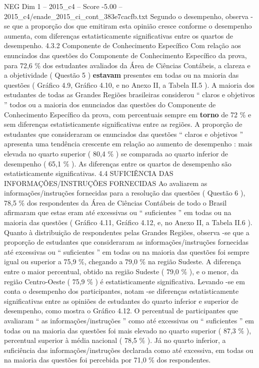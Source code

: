 \begin{textsample}{NEG Dim 1 – 2015\_c4 – Score -5.00 – 2015\_c4/enade\_2015\_ci\_cont\_383e7cacfb.txt}
Segundo o desempenho, observa -se que a proporção dos que emitiram esta opinião cresce conforme o desempenho aumenta, com diferenças estatisticamente significativas entre os quartos de desempenho. 4.3.2 Componente de Conhecimento Específico Com relação aos enunciados das questões do Componente de Conhecimento Específico da prova, para 72,6 \% dos estudantes avaliados da Área de Ciências Contábeis, a clareza e a objetividade ( Questão 5 ) \textbf{estavam} presentes em todas ou na maioria das questões ( Gráfico 4.9, Gráfico 4.10, e no Anexo II, a Tabela II.5 ).
A maioria dos estudantes de todas as Grandes Regiões brasileiras considerou “ claros e objetivos ” todos ou a maioria dos enunciados das questões do Componente de Conhecimento Específico da prova, com percentuais sempre em \textbf{torno} de 72 \% e sem diferenças estatisticamente significativas entre as regiões.
A proporção de estudantes que consideraram os enunciados das questões “ claros e objetivos ” apresenta uma tendência crescente em relação ao aumento de desempenho : mais elevada no quarto superior ( 80,4 \% ) se comparada ao quarto inferior de desempenho ( 65,1 \% ).
As diferenças entre os quartos de desempenho são estatisticamente significativas. 4.4 SUFICIÊNCIA DAS INFORMAÇÕES/INSTRUÇÕES FORNECIDAS Ao avaliarem as informações/instruções fornecidas para a resolução das questões ( Questão 6 ), 78,5 \% dos respondentes da Área de Ciências Contábeis de todo o Brasil afirmaram que estas eram até excessivas ou “ suficientes ” em todas ou na maioria das questões ( Gráfico 4.11, Gráfico 4.12, e, no Anexo II, a Tabela II.6 ).
Quanto à distribuição de respondentes pelas Grandes Regiões, observa -se que a proporção de estudantes que consideraram as informações/instruções fornecidas até excessivas ou “ suficientes ” em todas ou na maioria das questões foi sempre igual ou superior a 75,9 \%, chegando a 79,0 \% na região Sudeste.
A diferença entre o maior percentual, obtido na região Sudeste ( 79,0 \% ), e o menor, da região Centro-Oeste ( 75,9 \% ) é estatisticamente significativa.
Levando -se em conta o desempenho dos participantes, notam -se diferenças estatisticamente significativas entre as opiniões de estudantes do quarto inferior e superior de desempenho, como mostra o Gráfico 4.12.
O percentual de participantes que avaliaram “ as informações/instruções ” como até excessivas ou “ suficientes ” em todas ou na maioria das questões foi mais elevado no quarto superior ( 87,3 \% ), percentual superior à média nacional ( 78,5 \% ).
Já no quarto inferior, a suficiência das informações/instruções declarada como até excessiva, em todas ou na maioria das questões foi percebida por 71,0 \% dos respondentes.

\end{textsample}

